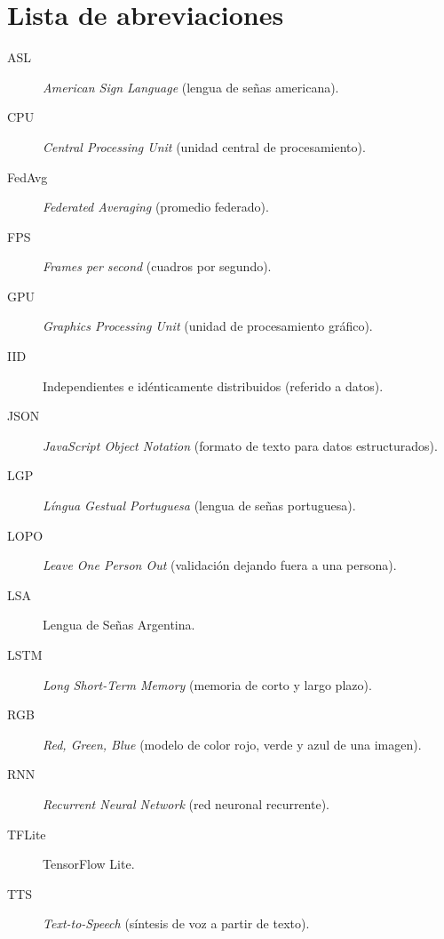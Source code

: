 \chapter*{Lista de abreviaciones}

\begin{description}
    \item[ASL] \emph{American Sign Language} (lengua de señas americana).
    \item[CPU] \emph{Central Processing Unit} (unidad central de procesamiento).
    \item[FedAvg] \emph{Federated Averaging} (promedio federado).
    \item[FPS] \emph{Frames per second} (cuadros por segundo).
    \item[GPU] \emph{Graphics Processing Unit} (unidad de procesamiento gráfico).
    \item[IID] Independientes e idénticamente distribuidos (referido a datos).
    \item[JSON] \emph{JavaScript Object Notation} (formato de texto para datos estructurados).
    \item[LGP] \emph{Língua Gestual Portuguesa} (lengua de señas portuguesa).
    \item[LOPO] \emph{Leave One Person Out} (validación dejando fuera a una persona).
    \item[LSA] Lengua de Señas Argentina.
    \item[LSTM] \emph{Long Short-Term Memory} (memoria de corto y largo plazo).
    \item[RGB] \emph{Red, Green, Blue} (modelo de color rojo, verde y azul de una imagen).
    \item[RNN] \emph{Recurrent Neural Network} (red neuronal recurrente).
    \item[TFLite] TensorFlow Lite.
    \item[TTS] \emph{Text-to-Speech} (síntesis de voz a partir de texto).
\end{description}
